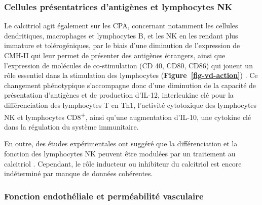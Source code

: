 \documentclass[
  a4paper,
  DIV=11,
  numbers=noendperiod,
  listof=totoc]{scrreprt}
\begin{document}
\subsubsection{Cellules présentatrices d'antigènes et lymphocytes
NK}\label{cellules-pruxe9sentatrices-dantiguxe8nes-et-lymphocytes-nk}

Le calcitriol agit également sur les \ac{CPA}, concernant notamment les
cellules dendritiques, macrophages et lymphocytes B, et les \ac{NK} en
les rendant plus immature et tolérogéniques, par le biais d'une
diminution de l'expression de \ac{CMH-II} qui leur permet de présenter
des antigènes étrangers, ainsi que l'expression de molécules de
co-stimulation (\ac{CD} 40, CD80, CD86) qui jouent un rôle essentiel
dans la stimulation des lymphocytes
(\textbf{Figure~\ref{fig-vd-action}})
\autocite{Charoenngam.2020,Meza-Meza.2022,Caprio.2017}. Ce changement
phénotypique s'accompagne donc d'une diminution de la capacité de
présentation d'antigènes et de production d'\ac{IL-12}, interleukine clé
pour la différenciation des lymphocytes T en Th1, l'activité cytotoxique
des lymphocytes \ac{NK} et lymphocytes CD8\textsuperscript{+}, ainsi
qu'une augmentation d'\ac{IL-10}, une cytokine clé dans la régulation du
système immunitaire.

En outre, des études expérimentales ont suggéré que la différenciation
et la fonction des lymphocytes \ac{NK} peuvent être modulées par un
traitement au calcitriol \autocite{Charoenngam.2020}. Cependant, le rôle
inducteur ou inhibiteur du calcitriol est encore indéterminé par manque
de données cohérentes.

\subsubsection{Fonction endothéliale et perméabilité
vasculaire}\label{fonction-endothuxe9liale-et-permuxe9abilituxe9-vasculaire}
\end{document}
